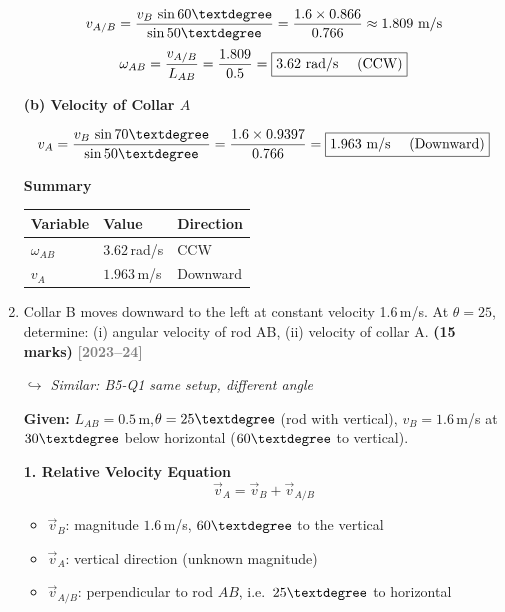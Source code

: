 \documentclass[12pt,a3paper]{article}
\newcommand{\yr}[1]{\hfill\textcolor{gray}{\small\textbf{[#1]}}}
\newcommand{\mk}[1]{\textcolor{orange!70!black}{\small\textbf{(#1 marks)}}}
\newcommand{\variant}[1]{\par\vspace{1pt}\textcolor{blue!50!black}%
  {\footnotesize\textit{$\hookrightarrow$ Similar: #1}}}
\begin{document}
\begin{enumerate}
\begin{tcolorbox}[enhanced,breakable,ansbox,colback=cH!4,colframe=cH,
  boxrule=0.8pt,arc=5pt,
  title={\textbf{Solution}},fonttitle=\bfseries\color{white},
  colbacktitle=cH]
\[
  v_{A/B} = \frac{v_B\,\sin 60\textdegree}{\sin 50\textdegree}
           = \frac{1.6\times 0.866}{0.766}
           \approx 1.809\text{ m/s}
\]
\[
  \omega_{AB} = \frac{v_{A/B}}{L_{AB}} = \frac{1.809}{0.5}
  = \boxed{3.62\text{ rad/s \quad(CCW)}}
\]

\medskip
\textbf{(b) Velocity of Collar $A$}

\[
  v_A = \frac{v_B\,\sin 70\textdegree}{\sin 50\textdegree}
      = \frac{1.6\times 0.9397}{0.766}
  = \boxed{1.963\text{ m/s \quad(Downward)}}
\]

\medskip
\textbf{Summary}

\begin{center}
\begin{tabular}{lll}
\toprule
\textbf{Variable} & \textbf{Value} & \textbf{Direction}\\
\midrule
$\omega_{AB}$ & $3.62$\,rad/s & CCW\\[3pt]
$v_A$         & $1.963$\,m/s  & Downward\\
\bottomrule
\end{tabular}
\end{center}

\end{tcolorbox}


\item \label{qlabel:B5-Q2}
Collar B moves downward to the left at constant velocity 1.6\,m/s. At $\theta = 25$\textdegree, determine: (i) angular velocity of rod AB, (ii) velocity of collar A. \mk{15}
\yr{2023--24} \variant{B5-Q1 same setup, different angle}


\begin{tcolorbox}[enhanced,breakable,ansbox,colback=cH!4,colframe=cH,
  boxrule=0.8pt,arc=5pt,
  title={\textbf{Solution}},fonttitle=\bfseries\color{white},
  colbacktitle=cH]

\textbf{Given:} $L_{AB} = 0.5$\,m,\quad $\theta = 25\textdegree$ (rod with vertical),\quad
$v_B = 1.6$\,m/s at $30\textdegree$ below horizontal ($60\textdegree$ to vertical).

\medskip
\textbf{1. Relative Velocity Equation}
\[
  \vec{v}_A = \vec{v}_B + \vec{v}_{A/B}
\]

\begin{itemize}[leftmargin=1.5em,itemsep=2pt]
  \item $\vec{v}_B$: magnitude $1.6$\,m/s, $60\textdegree$ to the vertical
  \item $\vec{v}_A$: vertical direction (unknown magnitude)
  \item $\vec{v}_{A/B}$: perpendicular to rod $AB$, i.e.\ $25\textdegree$ to horizontal
\end{itemize}


\end{tcolorbox}
\end{enumerate}
\end{document}
